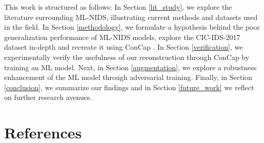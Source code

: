 \documentclass[english]{article}
\begin{document}
	This work is structured as follows: In Section \ref{lit_study}, we explore the literature surrounding ML-NIDS, illustrating current methods and datasets used in the field. In Section \ref{methodology}, we formulate a hypothesis behind the poor generalization performance of ML-NIDS models, explore the CIC-IDS-2017 dataset in-depth and recreate it using ConCap \cite{concap}. In Section \ref{verification}, we experimentally verify the usefulness of our reconstruction through ConCap by training an ML model. Next, in Section \ref{augmentation}, we explore a robustness enhancement of the ML model through adversarial training. Finally, in Section \ref{conclusion}, we summarize our findings and in Section \ref{future_work} we reflect on further research avenues.
	
	\newpage
	
	
	\newpage
	
	
	\newpage
	
	
	\newpage
	
	
	\newpage
	
	
	\newpage
	
	
	\newpage
	\section{References}
	\printbibliography[heading=none]	
	\newpage
	\appendix
	
\end{document}
